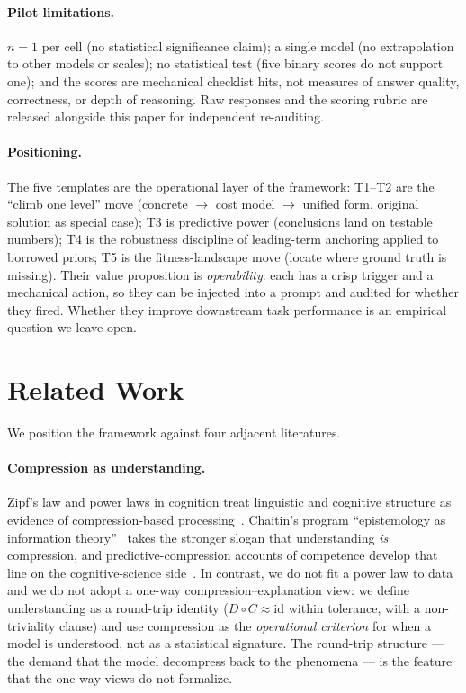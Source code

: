 \documentclass[11pt]{article}
\newcommand{\Cmap}{C}
\newcommand{\Dmap}{D}
\begin{document}
\paragraph{Pilot limitations.}
$n{=}1$ per cell (no statistical significance claim); a single model (no
extrapolation to other models or scales); no statistical test (five binary
scores do not support one); and the scores are mechanical checklist hits, not
measures of answer quality, correctness, or depth of reasoning. Raw responses
and the scoring rubric are released alongside this paper for independent
re-auditing.
\paragraph{Positioning.}
The five templates are the operational layer of the framework: T1--T2 are the
``climb one level'' move (concrete $\to$ cost model $\to$ unified form, original
solution as special case); T3 is predictive power (conclusions land on testable
numbers); T4 is the robustness discipline of leading-term anchoring applied to
borrowed priors; T5 is the fitness-landscape move (locate where ground truth is
missing). Their value proposition is \emph{operability}: each has a crisp
trigger and a mechanical action, so they can be injected into a prompt and
audited for whether they fired. Whether they improve downstream task performance
is an empirical question we leave open.
\section{Related Work}
\label{sec:related}

We position the framework against four adjacent literatures.

\paragraph{Compression as understanding.}
Zipf's law and power laws in cognition treat linguistic and cognitive structure
as evidence of compression-based processing~\cite{newman_powerlaws_2005}.
Chaitin's program ``epistemology as information theory''~\cite{chaitin_epistemology_2006}
takes the stronger slogan that understanding \emph{is} compression, and
predictive-compression accounts of competence develop that line on the
cognitive-science side~\cite{queloz_beckmann_2026}. In contrast, we do not fit
a power law to data and we do not adopt a one-way compression--explanation
view: we define understanding as a round-trip identity
($\Dmap\circ\Cmap\approx\mathrm{id}$ within tolerance, with a non-triviality
clause) and use compression as the \emph{operational criterion} for when a
model is understood, not as a statistical signature. The round-trip structure
--- the demand that the model decompress back to the phenomena --- is the
feature that the one-way views do not formalize.
\end{document}
